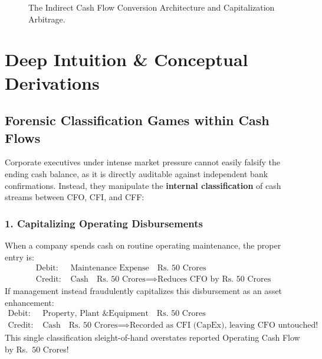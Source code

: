 \begin{figure}[htbp]
\caption{The Indirect Cash Flow Conversion Architecture and Capitalization Arbitrage.}
\label{fig:cash_waterfall}
\end{figure}

\section{Deep Intuition \& Conceptual Derivations}

\subsection{Forensic Classification Games within Cash Flows}
Corporate executives under intense market pressure cannot easily falsify the ending cash balance, as it is directly auditable against independent bank confirmations. Instead, they manipulate the \textbf{internal classification} of cash streams between CFO, CFI, and CFF:

\subsubsection{1. Capitalizing Operating Disbursements}
When a company spends cash on routine operating maintenance, the proper entry is:
\begin{align*}
\text{Debit: } & \text{Maintenance Expense} \quad \text{Rs.~50 Crores} \\
\text{Credit: } & \text{Cash} \quad \text{Rs.~50 Crores} \implies \text{Reduces CFO by Rs.~50 Crores}
\end{align*}
If management instead fraudulently capitalizes this disbursement as an asset enhancement:
\begin{align*}
\text{Debit: } & \text{Property, Plant \& Equipment} \quad \text{Rs.~50 Crores} \\
\text{Credit: } & \text{Cash} \quad \text{Rs.~50 Crores} \implies \text{Recorded as CFI (CapEx), leaving CFO untouched!}
\end{align*}
This single classification sleight-of-hand overstates reported Operating Cash Flow by Rs.~$50$ Crores!

